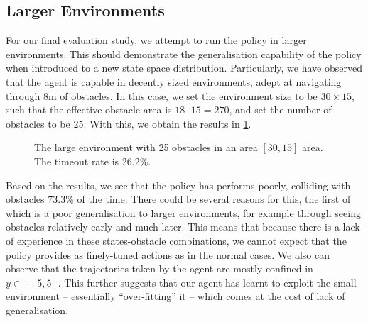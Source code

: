 \subsection{Larger Environments}
For our final evaluation study, we attempt to run the policy in larger environments. This should demonstrate the generalisation capability of the policy when introduced to a new state space distribution. Particularly, we have observed that the agent is capable in decently sized environments, adept at navigating through 8m of obstacles. In this case, we set the environment size to be $30\times15$, such that the effective obstacle area is $18\cdot15 = 270$, and set the number of obstacles to be 25. 
With this, we obtain the results in \cref{fig:7_large_env_9_policy}.
\begin{figure}[htb]
    \centering
    \captionsetup{justification=centering}
    \caption{The large environment with 25 obstacles in an area $[30, 15]$ area. The timeout rate is 26.2\%.}
    \label{fig:7_large_env_9_policy}
\end{figure}

Based on the results, we see that the policy has performs poorly, colliding with obstacles 73.3\% of the time. There could be several reasons for this, the first of which is a poor generalisation to larger environments, for example through seeing obstacles relatively early and much later. This means that because there is a lack of experience in these states-obstacle combinations, we cannot expect that the policy provides as finely-tuned actions as in the normal cases. We also can observe that the trajectories taken by the agent are mostly confined in $y \in [-5, 5]$. This further suggests that our agent has learnt to exploit the small environment -- essentially ``over-fitting'' it -- which comes at the cost of lack of generalisation.

